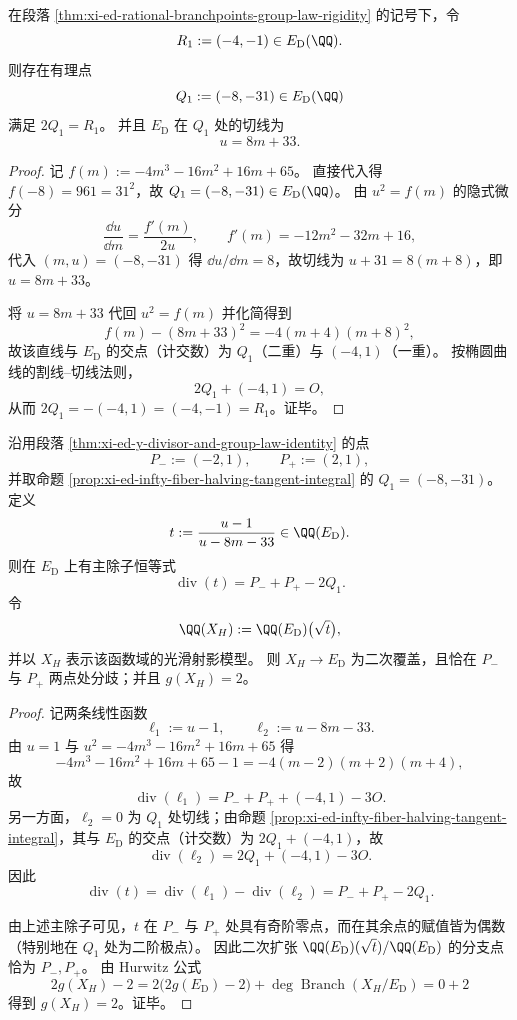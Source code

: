 \begin{proposition}\label{prop:xi-ed-infty-fiber-halving-tangent-integral}
在段落 \ref{thm:xi-ed-rational-branchpoints-group-law-rigidity} 的记号下，令
\[
R_1:=(-4,-1)\in E_{\mathrm D}(\QQ).
\]
则存在有理点
\[
Q_1:=(-8,-31)\in E_{\mathrm D}(\QQ)
\]
满足 \(2Q_1=R_1\)。
并且 \(E_{\mathrm D}\) 在 \(Q_1\) 处的切线为
\[
u=8m+33.
\]
\end{proposition}
\begin{proof}
记
\(
f(m):=-4m^3-16m^2+16m+65
\)。
直接代入得 \(f(-8)=961=31^2\)，故 \(Q_1=(-8,-31)\in E_{\mathrm D}(\QQ)\)。
由 \(u^2=f(m)\) 的隐式微分
\[
\frac{\dd u}{\dd m}=\frac{f'(m)}{2u},
\qquad
f'(m)=-12m^2-32m+16,
\]
代入 \((m,u)=(-8,-31)\) 得 \(\dd u/\dd m=8\)，故切线为 \(u+31=8(m+8)\)，即 \(u=8m+33\)。

将 \(u=8m+33\) 代回 \(u^2=f(m)\) 并化简得到
\[
f(m)-(8m+33)^2=-4(m+4)(m+8)^2,
\]
故该直线与 \(E_{\mathrm D}\) 的交点（计交数）为 \(Q_1\)（二重）与 \((-4,1)\)（一重）。
按椭圆曲线的割线--切线法则，
\[
2Q_1+(-4,1)=O,
\]
从而 \(2Q_1=-(-4,1)=(-4,-1)=R_1\)。证毕。
\end{proof}

\begin{theorem}\label{thm:xi-ed-xh-explicit-double-cover-branch-only-at-infty-fiber}
沿用段落 \ref{thm:xi-ed-y-divisor-and-group-law-identity} 的点
\[
P_-:=(-2,1),\qquad P_+:=(2,1),
\]
并取命题 \ref{prop:xi-ed-infty-fiber-halving-tangent-integral} 的 \(Q_1=(-8,-31)\)。
定义
\[
t:=\frac{u-1}{u-8m-33}\in \QQ(E_{\mathrm D}).
\]
则在 \(E_{\mathrm D}\) 上有主除子恒等式
\[
\operatorname{div}(t)=P_-+P_+-2Q_1.
\]
令
\[
\QQ(X_H):=\QQ(E_{\mathrm D})\bigl(\sqrt{t}\bigr),
\]
并以 \(X_H\) 表示该函数域的光滑射影模型。
则 \(X_H\to E_{\mathrm D}\) 为二次覆盖，且恰在 \(P_-\) 与 \(P_+\) 两点处分歧；并且 \(g(X_H)=2\)。
\end{theorem}
\begin{proof}
记两条线性函数
\[
\ell_1:=u-1,\qquad \ell_2:=u-8m-33.
\]
由 \(u=1\) 与 \(u^2=-4m^3-16m^2+16m+65\) 得
\[
-4m^3-16m^2+16m+65-1=-4(m-2)(m+2)(m+4),
\]
故
\[
\operatorname{div}(\ell_1)=P_-+P_++(-4,1)-3O.
\]
另一方面，\(\ell_2=0\) 为 \(Q_1\) 处切线；由命题 \ref{prop:xi-ed-infty-fiber-halving-tangent-integral}，其与 \(E_{\mathrm D}\) 的交点（计交数）为 \(2Q_1+(-4,1)\)，故
\[
\operatorname{div}(\ell_2)=2Q_1+(-4,1)-3O.
\]
因此
\[
\operatorname{div}(t)=\operatorname{div}(\ell_1)-\operatorname{div}(\ell_2)=P_-+P_+-2Q_1.
\]

由上述主除子可见，\(t\) 在 \(P_-\) 与 \(P_+\) 处具有奇阶零点，而在其余点的赋值皆为偶数（特别地在 \(Q_1\) 处为二阶极点）。
因此二次扩张 \(\QQ(E_{\mathrm D})(\sqrt{t})/\QQ(E_{\mathrm D})\) 的分支点恰为 \(P_-,P_+\)。
由 Hurwitz 公式
\[
2g(X_H)-2=2\bigl(2g(E_{\mathrm D})-2\bigr)+\deg\operatorname{Branch}(X_H/E_{\mathrm D})=0+2
\]
得到 \(g(X_H)=2\)。证毕。
\end{proof}

